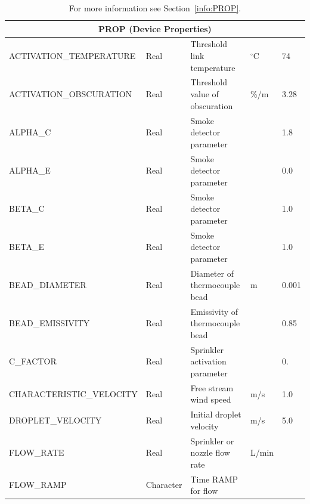 \documentclass[11pt]{book}
\begin{document}
\begin{table}[H]
\caption{For more information see Section~\ref{info:PROP}.}\label{tbl:PROP}
\noindent
\begin{tabular*}{\textwidth}{@{\extracolsep{\fill}}|l|l|l|l|l|}
\hline
\multicolumn{5}{|c|}{{\ct PROP} (Device Properties)} \\ \hline \hline
{\ct ACTIVATION\_TEMPERATURE}           & Real          & Threshold link temperature       & $^\circ$C             & 74        \\ \hline
{\ct ACTIVATION\_OBSCURATION}           & Real          & Threshold value of obscuration   & \%/m                  & 3.28      \\ \hline
{\ct ALPHA\_C}                          & Real          & Smoke detector parameter         &                       & 1.8       \\ \hline
{\ct ALPHA\_E}                          & Real          & Smoke detector parameter         &                       & 0.0       \\ \hline
{\ct BETA\_C}                           & Real          & Smoke detector parameter         &                       & 1.0       \\ \hline
{\ct BETA\_E}                           & Real          & Smoke detector parameter         &                       & 1.0       \\ \hline
{\ct BEAD\_DIAMETER}                    & Real          & Diameter of thermocouple bead    & m                     & 0.001     \\ \hline
{\ct BEAD\_EMISSIVITY}                  & Real          & Emissivity of thermocouple bead  &                       & 0.85      \\ \hline
{\ct C\_FACTOR}                         & Real          & Sprinkler activation parameter   &                       & 0.        \\ \hline
{\ct CHARACTERISTIC\_VELOCITY}          & Real          & Free stream wind speed           & m/s                   & 1.0       \\ \hline
{\ct DROPLET\_VELOCITY}                 & Real          & Initial droplet velocity         & m/s                   & 5.0       \\ \hline
{\ct FLOW\_RATE}                        & Real          & Sprinkler or nozzle flow rate    & L/min                 &           \\ \hline
{\ct FLOW\_RAMP}                        & Character     & Time {\ct RAMP} for flow         &                       &           \\ \hline

\end{tabular*}
\end{table}
\end{document}
